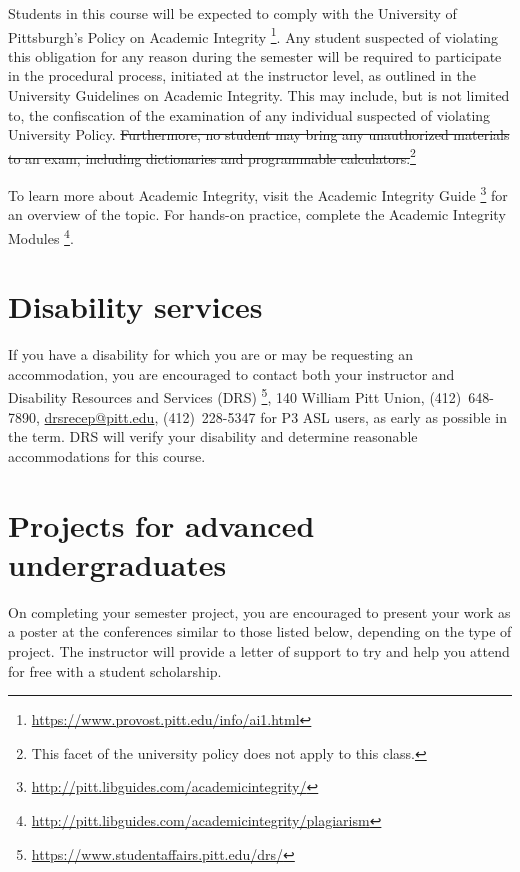 \documentclass[12pt]{article}
\begin{document}
Students in this course %
will be expected to comply with %
the University of Pittsburgh's %
Policy on Academic Integrity%
\footnote{\url{https://www.provost.pitt.edu/info/ai1.html}}.
%
Any student suspected of violating this obligation %
for any reason during the semester %
will be required to participate in the procedural process, %
initiated at the instructor level, %
as outlined in the University Guidelines on Academic Integrity.
%
This may include, %
but is not limited to, %
the confiscation of the examination %
of any individual suspected of violating University Policy.
%
\st{Furthermore, %
no student may bring any unauthorized materials to an exam, %
including dictionaries and programmable calculators.}\footnote{%
This facet of the university policy does not apply to this class.}

To learn more about Academic Integrity, %
visit the Academic Integrity Guide%
\footnote{\url{http://pitt.libguides.com/academicintegrity/}} %
for an overview of the topic.
%
For hands-on practice, %
complete the Academic Integrity Modules%
\footnote{\url{http://pitt.libguides.com/academicintegrity/plagiarism}}.

\section{Disability services}

If you have a disability %
for which you are or may be requesting an accommodation, %
you are encouraged to contact %
both your instructor and Disability Resources and Services (DRS)%
\footnote{\url{https://www.studentaffairs.pitt.edu/drs/}}, %
140 William Pitt Union, %
(412)~648-7890, %
\href{mailto:drsrecep@pitt.edu}{drsrecep@pitt.edu}, %
(412)~228-5347 for P3 ASL users, %
as early as possible in the term.
%
DRS will verify your disability %
and determine reasonable accommodations for this course.

\appendix

\section{Projects for advanced undergraduates}
\label{sec:projects}

On completing your semester project, %
you are encouraged to present your work as a poster %
at the conferences similar to those listed below, %
depending on the type of project.
%
The instructor will provide a letter of support %
to try and help you attend for free with a student scholarship.
\end{document}
